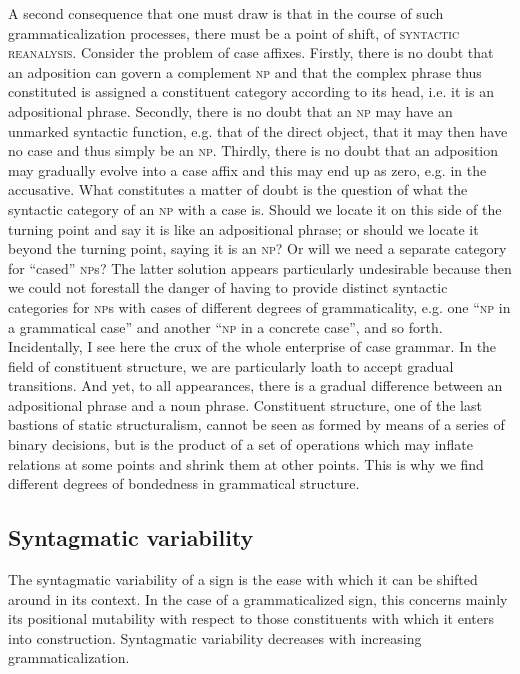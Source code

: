A second consequence that one must draw is that in the course of such grammaticalization processes, there must be a point of shift, of \textsc{syntactic reanalysis}. Consider the problem of case affixes. Firstly, there is no doubt that an adposition can govern a complement \textsc{np} and that the complex phrase thus constituted is assigned a constituent category according to its head, i.e. it is an adpositional phrase. Secondly, there is no doubt that an \textsc{np} may have an unmarked syntactic function, e.g. that of the direct object, that it may then have no case and thus simply be an \textsc{np}. Thirdly, there is no doubt that an adposition may gradually evolve into a case affix and this may end up as zero, e.g. in the accusative. What constitutes a matter of doubt is the question of what the syntactic category of an \textsc{np} with a case is. Should we locate it on this side of the turning point and say it is like an adpositional phrase; or should we locate it beyond the turning point, saying it is an \textsc{np}? Or will we need a separate category for ``cased'' \textsc{np}s? The latter solution appears particularly undesirable because then we could not forestall the danger of having to provide distinct syntactic categories for \textsc{np}s with cases of different degrees of grammaticality, e.g. one ``\textsc{np} in a grammatical case'' and another ``\textsc{np} in a concrete case'', and so forth. Incidentally, I see here the crux of the whole enterprise of case grammar. In the field of constituent structure, we are particularly loath to accept gradual transitions. And yet, to all appearances, there is a gradual difference between an adpositional phrase and a noun phrase. Constituent structure, one of the last bastions of static structuralism, cannot be seen as formed by means of a series of binary decisions, but is the product of a set of operations which may inflate relations at some points and shrink them at other points. This is why we find different degrees of bondedness in grammatical structure.

\subsection{Syntagmatic variability}

The syntagmatic variability of a sign is the ease with which it can be shifted around in its context. In the case of a grammaticalized sign, this concerns mainly its positional mutability with respect to those constituents with which it enters into construction. Syntagmatic variability decreases with increasing grammaticalization.

